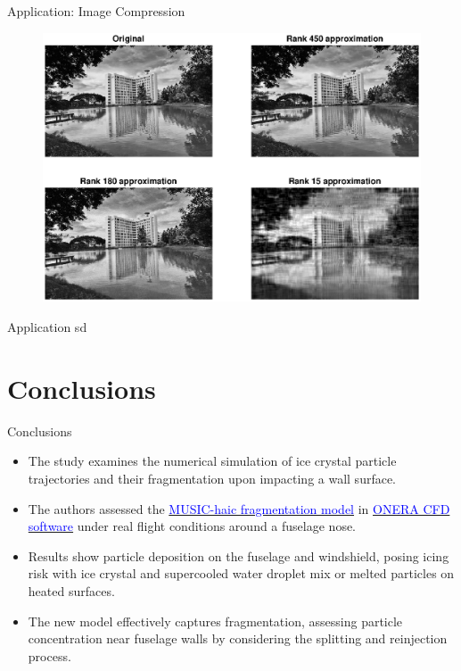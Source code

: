 \documentclass[aspectratio=169,xcolor=dvipsnames]{beamer}
\begin{document}
\begin{frame}{Application: Image Compression}
   \begin{figure}[h]
\includegraphics[width=12cm]{images/svdlowrank.eps}
\label{Fig2}
\end{figure}
\end{frame}

\begin{frame}{Application}
 sd
\end{frame}



\section{Conclusions}

\begin{frame}{Conclusions}
   \begin{itemize}
       \item The study examines the numerical simulation of ice crystal particle trajectories and their fragmentation upon impacting a wall surface.
       \item The authors assessed the \href{https://www.music-haic.eu/page/en/media-center/available-documentation.php}{\textcolor{blue}{MUSIC-haic fragmentation model}} in \href{https://www.onera.fr/en/site-index/computational-fluid-dynamics.html}{\textcolor{blue}{ONERA CFD software}} under real flight conditions around a fuselage nose.
       \item Results show particle deposition on the fuselage and windshield, posing icing risk with ice crystal and supercooled water droplet mix or melted particles on heated surfaces.
       \item The new model effectively captures fragmentation, assessing particle concentration near fuselage walls by considering the splitting and reinjection process.
   \end{itemize}
\end{frame}
\end{document}
